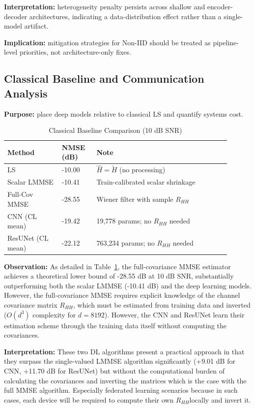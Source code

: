 \documentclass{llncs}
\begin{document}
\textbf{Interpretation:} heterogeneity penalty persists across shallow and encoder-decoder architectures, indicating a data-distribution effect rather than a single-model artifact.

\textbf{Implication:} mitigation strategies for Non-IID should be treated as pipeline-level priorities, not architecture-only fixes.

\subsection{Classical Baseline and Communication Analysis}
\textbf{Purpose:} place deep models relative to classical LS and quantify systems cost.

\begin{table}[htbp]
\caption{Classical Baseline Comparison (10 dB SNR)}
\label{tab:classical}
\centering
\begin{tabular}{p{0.22\linewidth}p{0.14\linewidth}p{0.54\linewidth}}
\toprule
Method & NMSE (dB) & Note \\
\midrule
LS & -10.00 & $\hat{H}=\tilde{H}$ (no processing) \\
Scalar LMMSE & -10.41 & Train-calibrated scalar shrinkage \\
Full-Cov MMSE & -28.55 & Wiener filter with sample $R_{HH}$ \\
\midrule
CNN (CL mean) & -19.42 & 19,778 params; no $R_{HH}$ needed \\
ResUNet (CL mean) & -22.12 & 763,234 params; no $R_{HH}$ needed \\
\bottomrule
\end{tabular}
\end{table}

\textbf{Observation:} As detailed in Table~\ref{tab:classical}, the full-covariance MMSE estimator achieves a theoretical lower bound of -28.55 dB at 10 dB SNR, substantially outperforming both the scalar LMMSE (-10.41 dB) and the deep learning models. However, the full-covariance MMSE requires explicit knowledge of the channel covariance matrix $R_{HH}$, which must be estimated from training data and inverted ($O(d^3)$ complexity for $d=8192$). However, the CNN and ResUNet learn their estimation scheme through the training data itself without computing the covariances.

\textbf{Interpretation:} These two DL algorithms present a practical approach in that they surpass the single-valued LMMSE algorithm significantly (+9.01 dB for CNN, +11.70 dB for ResUNet) but without the computational burden of calculating the covariances and inverting the matrices which is the case with the full MMSE algorithm.
Especially federated learning scenarios because in such cases, each device will be required to compute their own $R_{HH}$locally and invert it.
\end{document}
